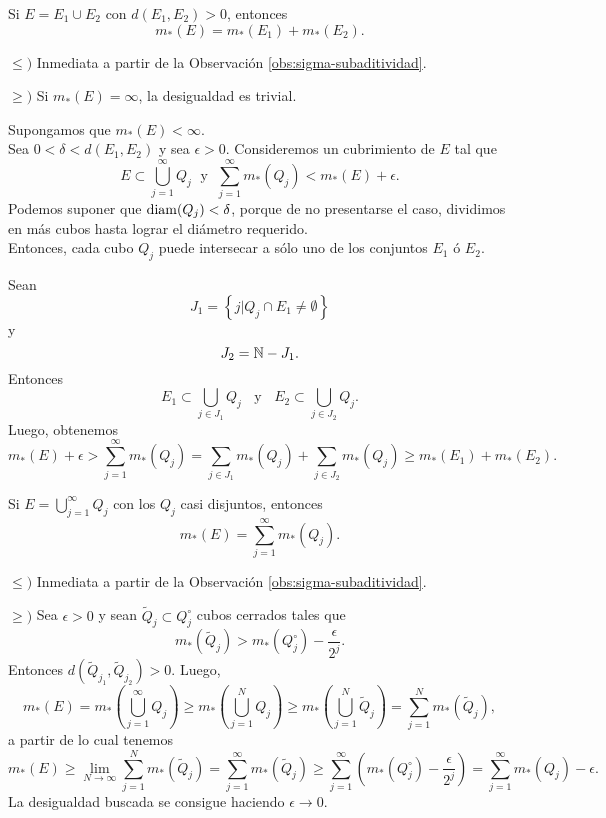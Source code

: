     \begin{observacion}{}
       Si $E=E_1\cup E_2$ con $d(E_1,E_2)>0$, entonces
    \[
    m_{*}(E)=m_{*}(E_1)+m_{*}(E_2).
    \]
    \begin{demo}
    $\leq)$ Inmediata a partir de la Observaci\'on \ref{obs:sigma-subaditividad}.
    
    $\geq)$
          Si $m_{*}(E)=\infty$,  la desigualdad es trivial. 
          
          Supongamos que $m_{*}(E)<\infty$. \\
    Sea $0<\delta <d(E_1, E_2)$ y sea $\epsilon>0$.
    Consideremos un cubrimiento de $E$ tal que 
    \[E\subset \bigcup\limits_{j=1}^{\infty} Q_j\;\mbox{  y }\;
    \sum\limits_{j=1}^{\infty} m_{*}(Q_j)<m_{*}(E)+\epsilon.\]
    Podemos suponer que $\operatorname{diam}(Q_j)<\delta$, porque de no presentarse el caso, dividimos en m\'as cubos hasta lograr el di\'ametro requerido.
    \\
    Entonces, cada cubo $Q_j$ puede intersecar a s\'olo uno de los conjuntos $E_1$ \'o $E_2$.

    Sean \[
    J_1=\left\{j|Q_j \cap E_1\neq \emptyset\right\}
        \]
        y 
    \[
    J_2=\mathbb{N}-J_1.
    \]
Entonces
    \[
E_1\subset \bigcup\limits_{j\in J_1} Q_j \;\;\mbox { y }\;\;
E_2\subset \bigcup\limits_{j \in J_2} Q_j.
    \]
    Luego, obtenemos
    \[
    m_{*}(E)+\epsilon>\sum\limits_{j=1}^{\infty} m_{*}(Q_j)
    =\sum\limits_{j \in J_1} m_{*}(Q_j)+\sum\limits_{j\in J_2} m_{*}(Q_j)
    \geq 
    m_{*}(E_1)+m_{*}(E_2).
    \]
    \end{demo}
    \end{observacion}
    
\begin{observacion}\label{obs:sigma-aditividad-medida-ext}
Si $E=\bigcup\limits_{j=1}^{\infty} Q_j$ con los  $Q_j$ casi disjuntos, entonces
\[
m_{*}(E)=\sum\limits_{j=1}^{\infty} m_{*}(Q_j).\]
\begin{demo}
$\leq)$ Inmediata a partir de la Observaci\'on \ref{obs:sigma-subaditividad}.

$\geq)$
Sea $\epsilon>0$ y sean $\widetilde{Q}_j\subset Q_j^{\circ}$ cubos cerrados tales que 
\[
m_{*}(\widetilde{Q}_j)>m_{*}(Q_j^{\circ})-\frac{\epsilon}{2^j}.
\]
Entonces $d(\widetilde{Q}_{j_1},\widetilde{Q}_{j_2})>0$.
Luego, 
\[
m_{*}(E) =m_{*}\left(\bigcup\limits_{j=1}^{\infty} Q_j\right)
\geq m_{*}\left(\bigcup\limits_{j=1}^{N} Q_j\right)
\geq m_{*}\left(\bigcup\limits_{j=1}^{N} \widetilde{Q}_j\right)
=\sum\limits_{j=1}^N m_{*}(\widetilde{Q}_j),
\]
a partir de lo cual tenemos
\[
m_{*}(E)\geq \lim\limits_{N\to \infty}\sum\limits_{j=1}^N  m_{*}(\widetilde{Q}_j)
=\sum\limits_{j=1}^{\infty} m_{*}(\widetilde{Q}_j)
\geq 
\sum\limits_{j=1}^{\infty} \left( m_{*}({Q}_j^{\circ})-\frac{\epsilon}{2^j}\right)
=
\sum\limits_{j=1}^{\infty} m_{*}({Q}_j)-\epsilon.
\]
La desigualdad buscada se consigue haciendo $\epsilon \to 0$.
\end{demo}

\end{observacion}

